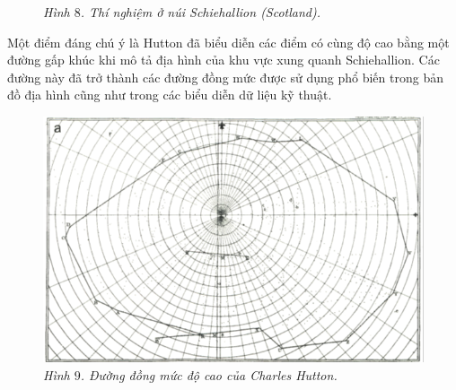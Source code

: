 \begin{multicols}{2}
\begin{figure}[H]
		\caption{\small\textit{\color{timhieukhoahoc}Hình $8$. Thí nghiệm ở  núi Schiehallion (Scotland).}}
		\vspace*{-10pt}
	\end{figure}
	Một điểm đáng chú ý là Hutton đã biểu diễn các điểm có cùng độ cao bằng một đường gấp khúc khi mô tả địa hình của khu vực xung quanh Schiehallion. Các đường này đã trở thành các đường đồng mức được sử dụng phổ biến trong bản đồ địa hình cũng như trong các biểu diễn dữ liệu kỹ thuật. 
	\begin{figure}[H]
		\vspace*{-5pt}
		\centering
		\captionsetup{labelformat= empty, justification=centering}
		\includegraphics[width =1\linewidth]{11}
		\caption{\small\textit{\color{timhieukhoahoc}Hình $9$. Đường đồng mức độ cao của Charles Hutton.}}
		\vspace*{-5pt}
	\end{figure}
	\vspace*{1pt}
	

\end{multicols}
